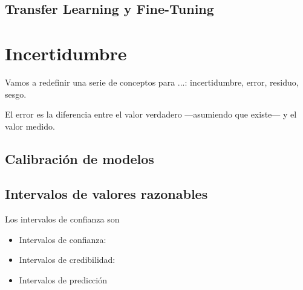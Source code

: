 




\subsection{Transfer Learning y Fine-Tuning}





\section{Incertidumbre}


Vamos a redefinir una serie de conceptos para ...: incertidumbre, error, residuo, sesgo.

El error es la diferencia entre el valor verdadero ---asumiendo que existe--- y el valor medido.





\subsection{Calibración de modelos}




\subsection{Intervalos de valores razonables}


Los intervalos de confianza son 

\begin{itemize}
    \item Intervalos de confianza:
    \item Intervalos de credibilidad: 
    \item Intervalos de predicción
\end{itemize}



